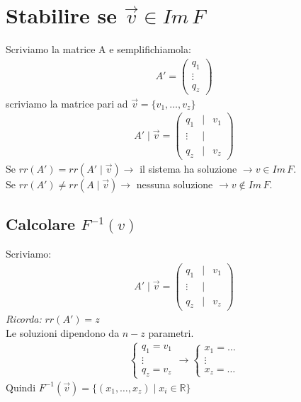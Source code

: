 \documentclass{article}
\begin{document}
\section{Stabilire se $\vec{v}\in Im \, F$}
Scriviamo la matrice A e semplifichiamola:
\begin{align*}
    A'=\begin{pmatrix}
        q_1 \\
        \vdots \\
        q_z
    \end{pmatrix}
\end{align*}
scriviamo la matrice pari ad $\vec{v}=\{v_1,\dots,v_z\}$
\begin{align*}
    A'\mid\vec{v}=\begin{pmatrix}
        q_1 & \mid & v_1\\
        \vdots & \mid \\
        q_z & \mid & v_z
    \end{pmatrix}
\end{align*}
Se $rr(A')=rr(A'\mid\vec{v})\to$ il sistema ha soluzione $\to v \in Im \, F$. \\
Se $rr(A')\neq rr(A\mid\vec{v}) \to$ nessuna soluzione $\to v \notin Im \, F$. \\
\subsection{Calcolare $F^{-1}(v)$}
Scriviamo:
\begin{align*}
    A'\mid\vec{v}=\begin{pmatrix}
        q_1 & \mid & v_1\\
        \vdots & \mid \\
        q_z & \mid & v_z
    \end{pmatrix}
\end{align*}
\textit{Ricorda: }$rr(A')=z$ \\
Le soluzioni dipendono da $n-z$ parametri.
\begin{align*}
    \begin{cases}
        q_1=v_1 \\
        \vdots \\
        q_z=v_z
    \end{cases}
    \to 
    \begin{cases}
        x_1 = \dots \\
        \vdots \\
        x_z = \dots
    \end{cases}
\end{align*}
Quindi $F^{-1}(\vec{v})=\{(x_1,\dots,x_z) \mid x_i \in \mathbb{R}\}$
\end{document}
